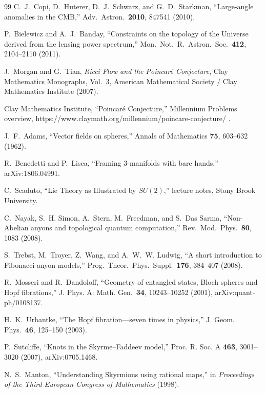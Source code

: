 \documentclass[aps,prd,onecolumn,superscriptaddress,longbibliography,nofootinbib,notitlepage]{revtex4-2}
\begin{document}
\begin{thebibliography}{99}
C.~J.~Copi, D.~Huterer, D.~J.~Schwarz, and G.~D.~Starkman,
``Large-angle anomalies in the CMB,''
Adv.\ Astron.\ \textbf{2010}, 847541 (2010).

P.~Bielewicz and A.~J.~Banday,
``Constraints on the topology of the Universe derived from the
  lensing power spectrum,''
Mon.\ Not.\ R.\ Astron.\ Soc.\ \textbf{412}, 2104--2110 (2011).

J.~Morgan and G.~Tian,
\textit{Ricci Flow and the Poincar\'e Conjecture},
Clay Mathematics Monographs, Vol.~3, American Mathematical Society / Clay Mathematics Institute (2007).

Clay Mathematics Institute,
``Poincar\'e Conjecture,'' Millennium Problems overview,
https://www.claymath.org/millennium/poincare-conjecture/ .

J.~F.~Adams,
``Vector fields on spheres,''
Annals of Mathematics \textbf{75}, 603--632 (1962).

R.~Benedetti and P.~Lisca,
``Framing 3-manifolds with bare hands,''
arXiv:1806.04991.

C.~Scaduto,
``Lie Theory as Illustrated by $SU(2)$,'' lecture notes, Stony Brook University.

C.~Nayak, S.~H. Simon, A.~Stern, M.~Freedman, and S.~Das Sarma,
``Non-Abelian anyons and topological quantum computation,''
Rev.\ Mod.\ Phys.\ \textbf{80}, 1083 (2008).

S.~Trebst, M.~Troyer, Z.~Wang, and A.~W.~W. Ludwig,
``A short introduction to Fibonacci anyon models,''
Prog.\ Theor.\ Phys.\ Suppl.\ \textbf{176}, 384--407 (2008).

R.~Mosseri and R.~Dandoloff,
``Geometry of entangled states, Bloch spheres and Hopf fibrations,''
J. Phys. A: Math. Gen.\ \textbf{34}, 10243--10252 (2001),
arXiv:quant-ph/0108137.

H.~K.~Urbantke,
``The Hopf fibration---seven times in physics,''
J. Geom. Phys.\ \textbf{46}, 125--150 (2003).

P.~Sutcliffe,
``Knots in the Skyrme--Faddeev model,''
Proc. R. Soc. A \textbf{463}, 3001--3020 (2007), arXiv:0705.1468.

N.~S.~Manton,
``Understanding Skyrmions using rational maps,''
in \textit{Proceedings of the Third European Congress of Mathematics} (1998).


\end{thebibliography}
\end{document}
